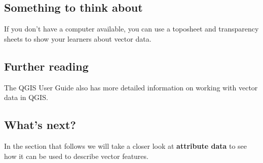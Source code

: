\subsection{Something to think about}

If you don't have a computer available, you can use a toposheet and
transparency sheets to show your learners about vector data.

\subsection{Further reading}

The QGIS User Guide also has more detailed information on working with vector
data in QGIS.

\subsection{What's next?}

In the section that follows we will take a closer look at \textbf{attribute
data} to see how it can be used to describe vector features.

